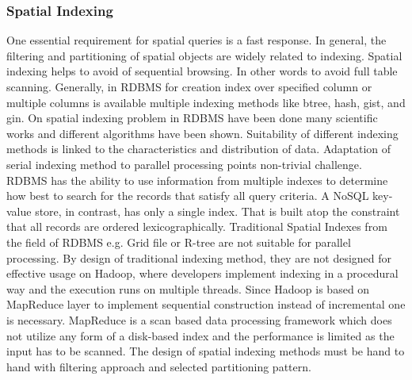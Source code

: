 \documentclass[a4paper,12pt,oneside]{report}
\begin{document}
		\subsubsection{Spatial Indexing}
		\label{Spatial_Indexing}
One essential requirement for spatial queries is a fast response. 
In general, the filtering and partitioning  of spatial objects are widely related to indexing. 
Spatial indexing helps to avoid of sequential browsing. In other words to avoid full table scanning.
Generally, in RDBMS for creation index over specified column or multiple columns is available multiple 
indexing methods like btree, hash, gist, and gin. On spatial indexing problem in RDBMS have 
been done many scientific works and different algorithms have been shown. Suitability of 
different indexing methods is linked to the characteristics and distribution of data. 
Adaptation of serial indexing method to parallel processing points non-trivial challenge. 
RDBMS has the ability to use information from multiple indexes to determine how best
to search for the records that satisfy all query criteria. A
NoSQL key-value store, in contrast, has only a single index.
That is built atop the constraint that all records are ordered
lexicographically. Traditional 
Spatial Indexes from the field of RDBMS e.g. Grid file or R-tree are not suitable for parallel 
processing. By design of traditional indexing method, they are not designed for effective 
usage on Hadoop, where developers implement indexing in a procedural way and the execution 
runs on multiple threads. Since Hadoop is based on MapReduce layer to implement 
sequential construction instead of incremental one  is necessary.  
MapReduce is a scan based data processing framework which does not utilize any form of a disk-based 
index and the performance is limited as the input has to be scanned. The design of spatial indexing methods 
must be hand to hand with filtering approach and selected partitioning pattern. 
\end{document}
